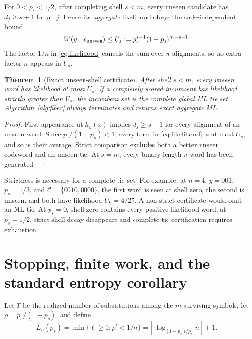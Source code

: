 \documentclass[conference]{IEEEtran}
\newtheorem{theorem}{Theorem}
\newcommand{\C}{\mathcal C}
\begin{document}
For $0<p_s<1/2$, after completing shell $s<m$, every unseen candidate has
$d_j\ge s+1$ for all $j$. Hence its \emph{aggregate} likelihood obeys the code-independent bound
\begin{equation}
 W(y\mid x_{\rm unseen})\le U_s:=p_s^{s+1}(1-p_s)^{m-s-1}. \label{eq:unseen}
\end{equation}
The factor $1/n$ in \eqref{eq:likelihood} cancels the sum over $n$ alignments, so no extra factor
$n$ appears in $U_s$.

\begin{theorem}[Exact unseen-shell certificate]\label{thm:certificate}
After shell $s<m$, every unseen word has likelihood at most $U_s$. If a completely scored incumbent
has likelihood strictly greater than $U_s$, the incumbent set is the complete global ML tie set.
Algorithm~\ref{alg:fiber} always terminates and returns exact aggregate ML.
\end{theorem}
\begin{proof}
First appearance at $h_y(x)$ implies $d_j\ge s+1$ for every alignment of an unseen word. Since
$p_s/(1-p_s)<1$, every term in \eqref{eq:likelihood} is at most $U_s$, and so is their average.
Strict comparison excludes both a better unseen codeword and an unseen tie. At $s=m$, every binary
length-$n$ word has been generated.
\end{proof}
Strictness is necessary for a complete tie set. For example, at $n=4$, $y=001$, $p_s=1/3$, and
$\C=\{0010,0000\}$, the first word is seen at shell zero, the second is unseen, and both have
likelihood $U_0=4/27$. A non-strict certificate would omit an ML tie. At $p_s=0$, shell zero
contains every positive-likelihood word; at $p_s=1/2$, strict shell decay disappears and complete
tie certification requires exhaustion.

\section{Stopping, finite work, and the standard entropy corollary}
Let $T$ be the realized number of substitutions among the $m$ surviving symbols, let
$\rho=p_s/(1-p_s)$, and define
\begin{equation}
 L_n(p_s)=\min\{\ell\ge1:\rho^\ell<1/n\}
 =\left\lfloor\log_{(1-p_s)/p_s}n\right\rfloor+1. \label{eq:Ln}
\end{equation}
\end{document}
